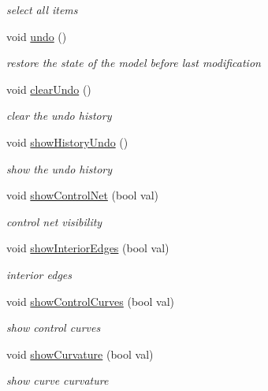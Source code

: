 \begin{DoxyCompactItemize}
\begin{DoxyCompactList}\small\item\em select all items \end{DoxyCompactList}\item 
void \hyperlink{classShipCAD_1_1Controller_a52b8812ceca0b4368dea2e2b4399d860}{undo} ()
\begin{DoxyCompactList}\small\item\em restore the state of the model before last modification \end{DoxyCompactList}\item 
void \hyperlink{classShipCAD_1_1Controller_ad9c16d37e77b98b2f289839d4f337325}{clear\-Undo} ()
\begin{DoxyCompactList}\small\item\em clear the undo history \end{DoxyCompactList}\item 
void \hyperlink{classShipCAD_1_1Controller_a32103fdef0de00b63eba1ef4282c5598}{show\-History\-Undo} ()
\begin{DoxyCompactList}\small\item\em show the undo history \end{DoxyCompactList}\item 
void \hyperlink{classShipCAD_1_1Controller_a81d04dc566ba580aa225c5369767220f}{show\-Control\-Net} (bool val)
\begin{DoxyCompactList}\small\item\em control net visibility \end{DoxyCompactList}\item 
void \hyperlink{classShipCAD_1_1Controller_a3f722582d47e27a34deb467156056f3b}{show\-Interior\-Edges} (bool val)
\begin{DoxyCompactList}\small\item\em interior edges \end{DoxyCompactList}\item 
void \hyperlink{classShipCAD_1_1Controller_a2c3339b26ab0856a66720e370523d80c}{show\-Control\-Curves} (bool val)
\begin{DoxyCompactList}\small\item\em show control curves \end{DoxyCompactList}\item 
void \hyperlink{classShipCAD_1_1Controller_a9ba96a9070361816f926d8b0d2becd38}{show\-Curvature} (bool val)
\begin{DoxyCompactList}\small\item\em show curve curvature \end{DoxyCompactList}\item 

\end{DoxyCompactItemize}
